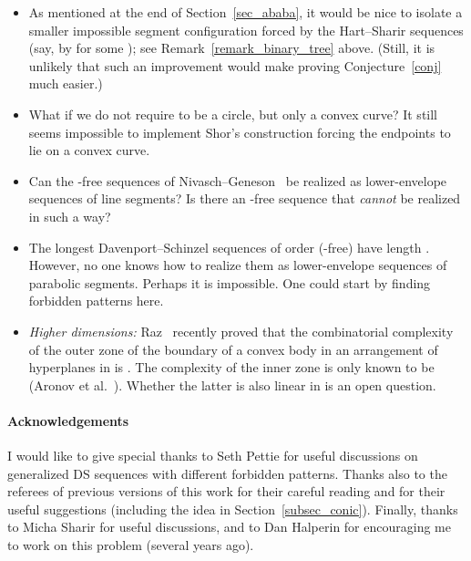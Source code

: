 \documentclass[11pt]{article}
\theoremstyle{definition}
\theoremstyle{remark}
\begin{document}
\begin{itemize}
\item As mentioned at the end of Section~\ref{sec_ababa}, it would be nice to isolate a smaller impossible segment configuration forced by the Hart--Sharir sequences (say, by  for some ); see Remark~\ref{remark_binary_tree} above. (Still, it is unlikely that such an improvement would make proving Conjecture~\ref{conj} much easier.)

\item What if we do not require  to be a circle, but only a convex curve? It still seems impossible to implement Shor's construction forcing the endpoints to lie on a convex curve.

\item  Can the -free sequences of Nivasch--Geneson~\cite{geneson,yo_DS} be realized as lower-envelope sequences of line segments? Is there an -free sequence that \emph{cannot} be realized in such a way?

\item The longest Davenport--Schinzel sequences of order  (-free) have length . However, no one knows how to realize them as lower-envelope sequences of parabolic segments. Perhaps it is impossible. One could start by finding forbidden patterns here.

\item \emph{Higher dimensions:} Raz~\cite{raz} recently proved that the combinatorial complexity of the outer zone of the boundary of a convex body in an arrangement of hyperplanes in  is . The complexity of the inner zone is only known to be  (Aronov et al.~\cite{APS}). Whether the latter is also linear in  is an open question.
\end{itemize}

\paragraph{Acknowledgements} I would like to give special thanks to Seth Pettie for useful discussions on generalized DS sequences with different forbidden patterns. Thanks also to the referees of previous versions of this work for their careful reading and for their useful suggestions (including the idea in Section~\ref{subsec_conic}). Finally, thanks to Micha Sharir for useful discussions, and to Dan Halperin for encouraging me to work on this problem (several years ago).
\end{document}
